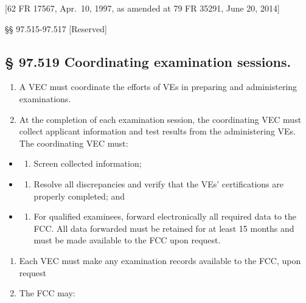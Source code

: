 \documentclass[
  letterpaper,
  DIV=11,
  numbers=noendperiod]{scrreport}
\providecommand{\tightlist}{%
  \setlength{\itemsep}{0pt}\setlength{\parskip}{0pt}}\usepackage{longtable,booktabs,array}
\begin{document}
{[}62 FR 17567, Apr.~10, 1997, as amended at 79 FR 35291, June 20,
2014{]}

§§ 97.515-97.517 {[}Reserved{]}

\hypertarget{coordinating-examination-sessions.}{%
\subsection*{§ 97.519 Coordinating examination
sessions.}\label{coordinating-examination-sessions.}}

\begin{enumerate}
\def\labelenumi{(\alph{enumi})}
\item
  A VEC must coordinate the efforts of VEs in preparing and
  administering examinations.
\item
  At the completion of each examination session, the coordinating VEC
  must collect applicant information and test results from the
  administering VEs. The coordinating VEC must:
\end{enumerate}

\begin{itemize}
\item
  \begin{enumerate}
  \def\labelenumi{(\arabic{enumi})}
  \tightlist
  \item
    Screen collected information;
  \end{enumerate}
\item
  \begin{enumerate}
  \def\labelenumi{(\arabic{enumi})}
  \setcounter{enumi}{1}
  \tightlist
  \item
    Resolve all discrepancies and verify that the VEs' certifications
    are properly completed; and
  \end{enumerate}
\item
  \begin{enumerate}
  \def\labelenumi{(\arabic{enumi})}
  \setcounter{enumi}{2}
  \tightlist
  \item
    For qualified examinees, forward electronically all required data to
    the FCC. All data forwarded must be retained for at least 15 months
    and must be made available to the FCC upon request.
  \end{enumerate}
\end{itemize}

\begin{enumerate}
\def\labelenumi{(\alph{enumi})}
\setcounter{enumi}{2}
\item
  Each VEC must make any examination records available to the FCC, upon
  request
\item
  The FCC may:
\end{enumerate}
\end{document}
